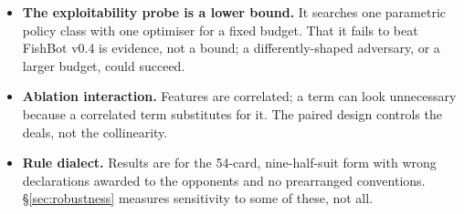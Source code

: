 \begin{itemize}
        patience on both sides deadlocks. Our escalation rule terminates every
        game in this study, but its horizons are hand-set constants, not the
        output of any analysis, and a differently-tuned pair of policies could
        still find a cycle inside them.
  \item \textbf{The exploitability probe is a lower bound.} It searches one
        parametric policy class with one optimiser for a fixed budget. That it
        fails to beat FishBot v0.4 is evidence, not a bound; a differently-shaped
        adversary, or a larger budget, could succeed.
  \item \textbf{Ablation interaction.} Features are correlated; a term can look
        unnecessary because a correlated term substitutes for it. The paired
        design controls the deals, not the collinearity.
  \item \textbf{Rule dialect.} Results are for the 54-card, nine-half-suit form
        with wrong declarations awarded to the opponents and no prearranged
        conventions. \S\ref{sec:robustness} measures sensitivity to some of
        these, not all.
\end{itemize}
